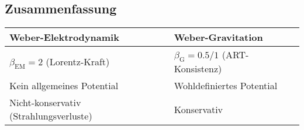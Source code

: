 \subsection*{Zusammenfassung}
\begin{tabular}{ll}
\textbf{Weber-Elektrodynamik} & \textbf{Weber-Gravitation} \\ \hline
$\beta_{\text{EM}} = 2$ (Lorentz-Kraft) & $\beta_{\text{G}} = 0.5/1$ (ART-Konsistenz) \\
Kein allgemeines Potential & Wohldefiniertes Potential \\
Nicht-konservativ (Strahlungsverluste) & Konservativ \\
\end{tabular}
